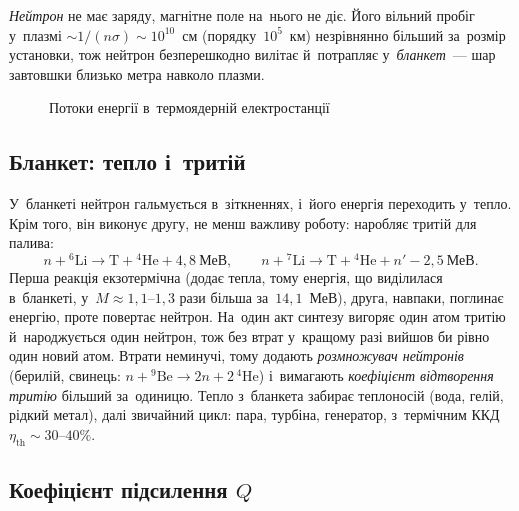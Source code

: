 \emph{Нейтрон} не має заряду, магнітне поле на~нього не діє. Його вільний пробіг у~плазмі
$\sim1/(n\sigma)\sim10^{10}$~см (порядку~$10^{5}$~км) незрівнянно більший за~розмір установки,
тож нейтрон безперешкодно вилітає й~потрапляє у~\emph{бланкет}~--- шар завтовшки близько
метра навколо плазми.

\begin{figure}[ht]\centering
	\caption{Потоки енергії в~термоядерній електростанції}
	\label{fig:energy-flow}
\end{figure}

\subsection*{Бланкет: тепло і~тритій}

У~бланкеті нейтрон гальмується в~зіткненнях, і~його енергія переходить у~тепло. Крім того,
він виконує другу, не менш важливу роботу: наробляє тритій для палива:
\begin{equation*}
	n+{}^6\mathrm{Li}\to\mathrm T+{}^4\mathrm{He}+4{,}8~\text{МеВ},\qquad
	n+{}^7\mathrm{Li}\to\mathrm T+{}^4\mathrm{He}+n'-2{,}5~\text{МеВ}.
\end{equation*}
Перша реакція екзотермічна (додає тепла, тому енергія, що виділилася в~бланкеті,
у~$M\approx1{,}1$--$1{,}3$ рази більша за~$14{,}1$~МеВ), друга, навпаки, поглинає енергію,
проте повертає нейтрон. На~один акт синтезу вигоряє один атом тритію й~народжується один
нейтрон, тож без втрат у~кращому разі вийшов би рівно один новий атом. Втрати неминучі,
тому додають \emph{розмножувач нейтронів} (берилій, свинець:
$n+{}^9\mathrm{Be}\to2n+2\,{}^4\mathrm{He}$) і~вимагають \emph{коефіцієнт відтворення
тритію} більший за~одиницю. Тепло з~бланкета забирає теплоносій (вода, гелій, рідкий
метал), далі звичайний цикл: пара, турбіна, генератор, з~термічним ККД
$\eta_{\mathrm{th}}\sim30$--$40\%$.

\subsection*{Коефіцієнт підсилення \texorpdfstring{$Q$}{Q}}

